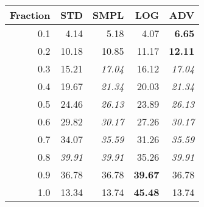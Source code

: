 \documentclass{standalone}
\begin{document}
\begin{tabular}{r|rrrr}
      \toprule
      Fraction & STD & SMPL & LOG & ADV\\
      \midrule
      0.1 & 4.14 & 5.18 & 4.07 & \textbf{6.65}\\
  0.2 & 10.18 & 10.85 & 11.17 & \textbf{12.11}\\
  0.3 & 15.21 & \emph{17.04} & 16.12 & \emph{17.04}\\
  0.4 & 19.67 & \emph{21.34} & 20.03 & \emph{21.34}\\
  0.5 & 24.46 & \emph{26.13} & 23.89 & \emph{26.13}\\
  0.6 & 29.82 & \emph{30.17} & 27.26 & \emph{30.17}\\
  0.7 & 34.07 & \emph{35.59} & 31.26 & \emph{35.59}\\
  0.8 & \emph{39.91} & \emph{39.91} & 35.26 & \emph{39.91}\\
  0.9 & 36.78 & 36.78 & \textbf{39.67} & 36.78\\
  1.0 & 13.34 & 13.74 & \textbf{45.48} & 13.74\\
  \bottomrule
\end{tabular}
\end{document}
